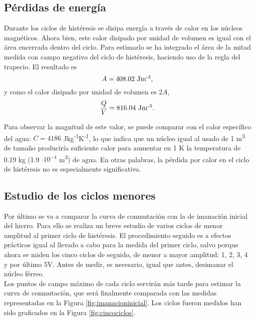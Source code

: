 \documentclass[fleqn,11pt]{SelfArx} %
\begin{document}
\subsection{Pérdidas de energía}
Durante los ciclos de histéresis se disipa energía a través de calor en los núcleos magnéticos. Ahora bien, este calor disipado por unidad de volumen es igual con el área encerrada dentro del ciclo. Para estimarlo se ha integrado el área de la mitad medida con campo negativo del ciclo de histéresis, haciendo uso de la regla del trapecio. El resultado es 
\begin{equation*}
	A = 408\mbox{.}02 \mbox{ Jm\textsuperscript{-3}}, 
\end{equation*}
y como el calor disipado por unidad de volumen es $2A$,
\begin{equation*}
	\frac{Q}{V} = 816\mbox{.}04 \mbox{ Jm\textsuperscript{-3}}.
\end{equation*}

Para observar la magnitud de este valor, se puede comparar con el calor específico del agua: $C = 4186$ Jkg\textsuperscript{-1}K\textsuperscript{-1}, lo que indica que un núcleo igual al usado de 1 m\textsuperscript{3} de tamaño produciría suficiente calor para aumentar en 1 K la temperatura de 0.19 kg (1.9 $\cdot 10^{-4}$ m\textsuperscript{3}) de agua. En otras palabras, la pérdida por calor en el ciclo de histéresis no es especialmente significativa.
\subsection{Estudio de los ciclos menores}
Por último se va a comparar la curva de conmutación con la de imanación inicial del hierro. Para ello se realiza un breve estudio de varios ciclos de menor amplitud al primer ciclo de histéresis. El procedimiento seguido es a efectos prácticos igual al llevado a cabo para la medida del primer ciclo, salvo porque ahora se miden los cinco ciclos de seguido, de menor a mayor amplitud: 1, 2, 3, 4 y por último 5V. Antes de medir, es necesario, igual que antes, desimanar el núcleo férreo. \\

Los puntos de campo máximo de cada ciclo servirán más tarde para estimar la curva de conmutación, que será finalmente comparada con las medidas representadas en la Figura \ref{fig:imanacioninicial}. Los ciclos fueron medidos han sido graficados en la Figura \ref{fig:cincociclos}.
\end{document}
